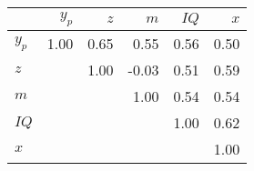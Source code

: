 \begin{tabular}{lrrrrr}
\hline
 & $y_{p}$  & $z$  & $m$  & $IQ$  & $x$  \\ 
\hline
$y_{p}$ & 1.00  & 0.65  & 0.55  & 0.56  & 0.50  \\ 
$z$ &   & 1.00  & -0.03  & 0.51  & 0.59  \\ 
$m$ &   &   & 1.00  & 0.54  & 0.54  \\ 
$IQ$ &   &   &   & 1.00  & 0.62  \\ 
$x$ &   &   &   &   & 1.00  \\ 
\hline
\end{tabular}%
